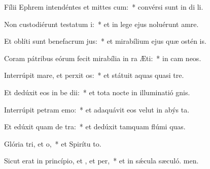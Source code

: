 \item Fílii Ephrem intendéntes et mittes cum:~* convérsi sunt in di li.
\item Non custodiérunt testatum i:~* et in lege ejus noluérunt amre.
\item Et oblíti sunt benefacrum jus:~* et mirabílium ejus quæ ostén is.
\item Coram pátribus eórum fecit mirabília in ra Æti:~* in cam neos.
\item Interrúpit mare, et perxit os:~* et státuit aquas quasi  tre.
\item Et dedúxit eos in be dii:~* et tota nocte in illuminatió gnis.
\item Interrúpit petram  emo:~* et adaquávit eos velut in abýs ta.
\item Et edúxit quam de tra:~* et dedúxit tamquam flúmi quas.
\item Glória tri, et o,~* et Spirítu to.
\item Sicut erat in princípio, et , et per,~* et in sǽcula sæculó. men.
